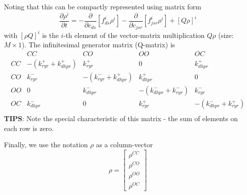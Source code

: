 Noting that this can be compactly represented using matrix form
\begin{equation}
  \label{eq:204}
  \frac{\partial \rho^i}{\partial t} = - \frac{\partial}{\partial
    c_{ds}}[f^i_{ds}\rho^i] - \frac{\partial}{\partial
    c_{jsr}}[f^i_{jsr}\rho^i]  + [Q\rho]^i
\end{equation}
with $[\rho Q]^i$ is the $i$-th element of the vector-matrix
multiplication $ Q\rho$ (size: $M\times 1$).  The infinitesimal generator matrix (Q-matrix) is
\begin{equation}
  \label{eq:211}
  \begin{array}{ccccc}
         & CC & CO & OO & OC \\
     CC  & -(k^+_{ryr}+k^+_{dhpr}) & k^+_{ryr}  & 0  & k^+_{dhpr} \\
     CO  &  k^-_{ryr} & -(k^-_{ryr} +k^+_{dhpr})  & k^+_{dhpr} & 0\\
     OO   & 0 & k^-_{dhpr} &-(k^-_{dhpr}+k^-_{ryr} )  & k^-_{ryr} \\
     OC   & k^-_{dhpr}  & 0 & k^+_{ryr} & -(k^-_{dhpr}+k^+_{ryr}) \\
  \end{array}
\end{equation}
{\bf TIPS}: Note the special characteristic of this matrix - the sum
of elements on each row is zero.

Finally, we use the notation $\rho$ as a column-vector
\begin{equation}
  \label{eq:212}
  \rho = \left[
    \begin{array}{c}
      \rho^{CC} \\
      \rho^{CO} \\
      \rho^{OO} \\
      \rho^{OC}
    \end{array}
    \right]
\end{equation}


